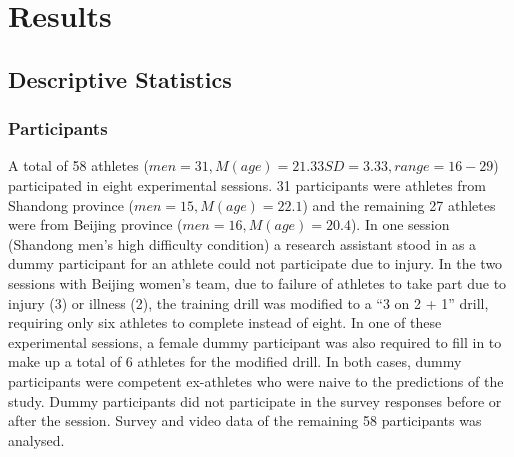 

\section{Results}




\subsection{Descriptive Statistics \label{sec:descriptives}}

\subsubsection{Participants}

A total of 58 athletes ($men = 31, M(age) = 21.33 SD = 3.33, range = 16-29$) participated in eight experimental sessions. 31 participants were athletes from Shandong province ($men = 15, M(age) = 22.1$) and the remaining 27 athletes were from Beijing province ($men = 16, M(age) = 20.4$).  In one session (Shandong men's high difficulty condition) a research assistant stood in as a dummy participant for an athlete could not participate due to injury.  In the two sessions with Beijing women's team, due to failure of athletes to take part due to injury (3) or illness (2), the training drill was modified to a ``3 on 2 + 1'' drill, requiring only six athletes to complete instead of eight. In one of these experimental sessions, a female dummy participant was also required to fill in to make up a total of 6 athletes for the modified drill.  In both cases, dummy participants were competent ex-athletes who were naive to the predictions of the study.  Dummy participants did not participate in the survey responses before or after the session. Survey and video data of the remaining 58 participants was analysed.



